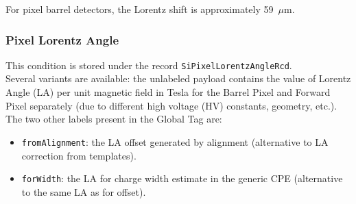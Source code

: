 For pixel barrel detectors, the Lorentz shift is approximately 59~\(\mu\)m.

\subsubsection{Pixel Lorentz Angle}
This condition is stored under the record  \texttt{SiPixelLorentzAngleRcd}.\\
Several variants are available: the unlabeled payload contains the value of Lorentz Angle (LA) per unit magnetic field in Tesla for the Barrel Pixel and Forward Pixel separately (due to different high voltage (HV) constants, geometry, etc.).\\
The two other labels present in the Global Tag are:
\begin{itemize}
\item \texttt{fromAlignment}: the LA offset generated by alignment (alternative to LA correction from templates).
\item \texttt{forWidth}: the LA for charge width estimate in the generic CPE (alternative to the same LA as for offset). 
\end{itemize}

